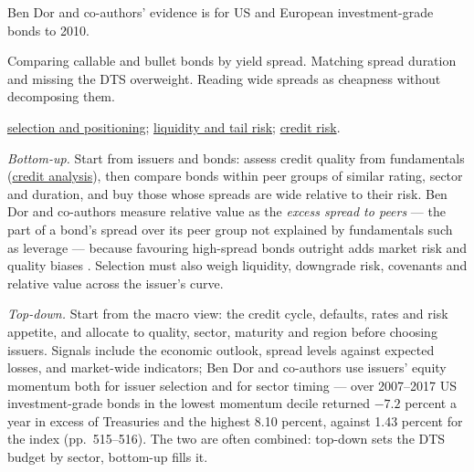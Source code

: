\begin{qfmethod}
 Ben Dor and co-authors' evidence is for US and European investment-grade bonds to 2010.

 Comparing callable and bullet bonds by yield spread. Matching spread duration and missing the DTS overweight. Reading wide spreads as cheapness without decomposing them.

 \hyperref[meth:credit-selection-positioning]{selection and positioning}; \hyperref[meth:credit-liquidity-tail-risk]{liquidity and tail risk}; \hyperref[def:credit-risk-components]{credit risk}.

\end{qfmethod}

\begin{qfmethod}\label{meth:credit-selection-positioning}
 \emph{Bottom-up.} Start from issuers and bonds: assess credit quality from fundamentals (\hyperref[meth:corporate-credit-analysis]{credit analysis}), then compare bonds within peer groups of similar rating, sector and duration, and buy those whose spreads are wide relative to their risk. Ben Dor and co-authors measure relative value as the \emph{excess spread to peers} --- the part of a bond's spread over its peer group not explained by fundamentals such as leverage --- because favouring high-spread bonds outright adds market risk and quality biases \citep[pp.~413--415]{ben-dor-systematic-credit-2021}. Selection must also weigh liquidity, downgrade risk, covenants and relative value across the issuer's curve.

\emph{Top-down.} Start from the macro view: the credit cycle, defaults, rates and risk appetite, and allocate to quality, sector, maturity and region before choosing issuers. Signals include the economic outlook, spread levels against expected losses, and market-wide indicators; Ben Dor and co-authors use issuers' equity momentum both for issuer selection and for sector timing --- over 2007--2017 US investment-grade bonds in the lowest momentum decile returned $-7.2$ percent a year in excess of Treasuries and the highest 8.10 percent, against 1.43 percent for the index (pp.~515--516). The two are often combined: top-down sets the DTS budget by sector, bottom-up fills it.


\end{qfmethod}
